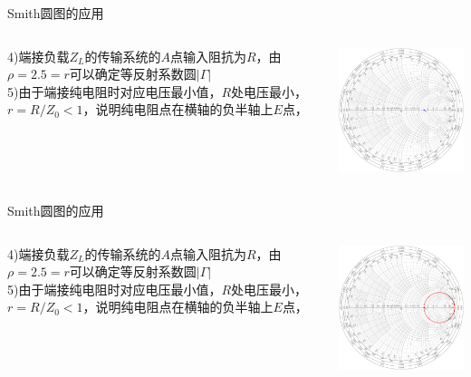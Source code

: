 \begin{frame}{Smith圆图的应用}
  \begin{columns}
    \begin{column}{0.4\linewidth}
      4)\quad 端接负载$Z_L$的传输系统的$A$点输入阻抗为$R$，由$\rho=2.5=r$可以确定等反射系数圆$\lvert\Gamma\rvert$\\
      5)\quad 由于端接纯电阻时对应电压最小值，$R$处电压最小，$r=R/Z_0<1$，说明纯电阻点在横轴的负半轴上$E$点，
    \end{column}
    \begin{column}{0.6\linewidth}
      \includegraphics[width=7cm]{fig4-17-2.pdf}
    \end{column}
  \end{columns}
\end{frame}

\begin{frame}{Smith圆图的应用}
  \begin{columns}
    \begin{column}{0.4\linewidth}
      4)\quad 端接负载$Z_L$的传输系统的$A$点输入阻抗为$R$，由$\rho=2.5=r$可以确定等反射系数圆$\lvert\Gamma\rvert$\\
      5)\quad 由于端接纯电阻时对应电压最小值，$R$处电压最小，$r=R/Z_0<1$，说明纯电阻点在横轴的负半轴上$E$点，
    \end{column}
    \begin{column}{0.6\linewidth}
      \includegraphics[width=7cm]{fig4-17-3.pdf}
    \end{column}
  \end{columns}
\end{frame}

